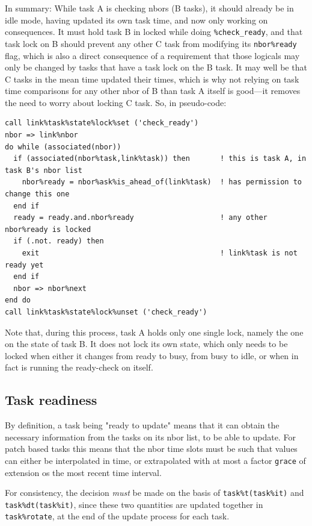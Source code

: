 \documentclass[paper=a4,fontsize=11pt]{scrartcl}
\numberwithin{equation}{section}		%
\numberwithin{figure}{section}			%
\numberwithin{table}{section}				%
\newcommand{\codecolor}{\color{Blue}}
\newcommand{\Code}[1]{{\codecolor\texttt{#1}}}
\begin{document}
In summary:  While task A is checking nbors (B tasks), it should already be in idle mode, having updated its own task time, and now only working on consequences.   It must hold task B in locked while doing \verb|%check_ready|, and that task lock on B should prevent any other C task from modifying its \verb|nbor%ready| flag, which is also a direct consequence of a requirement that those logicals may only be changed by tasks that have a task lock on the B task.  It may well be that C tasks in the mean time updated their times, which is why not relying on task time comparisons for any other nbor of B than task A itself is good---it removes the need to worry about locking C task.  So, in pseudo-code:
{\small\codecolor\begin{verbatim}
call link%task%state%lock%set ('check_ready')
nbor => link%nbor
do while (associated(nbor))
  if (associated(nbor%task,link%task)) then       ! this is task A, in task B's nbor list
    nbor%ready = nbor%ask%is_ahead_of(link%task)  ! has permission to change this one
  end if
  ready = ready.and.nbor%ready                    ! any other nbor%ready is locked
  if (.not. ready) then
    exit                                          ! link%task is not ready yet
  end if
  nbor => nbor%next
end do
call link%task%state%lock%unset ('check_ready')
\end{verbatim}}
Note that, during this process, task A holds only one single lock, namely the one on the state of task B.  It does not lock its own state, which only needs to be locked when either it changes from ready to busy, from busy to idle, or when in fact is running the ready-check on itself.

\subsection{Task readiness}

By definition, a task being "ready to update" means that it can obtain the necessary information from the tasks on its nbor list, to be able to update.  For patch based tasks this means that the nbor time slots must be such that values can either be interpolated in time, or extrapolated with at most a factor \Code{grace} of extension os the most recent time interval.

For consistency, the decision \textit{must} be made on the basis of \Code{task\%t(task\%it)} and \Code{task\%dt(task\%it)}, since these two quantities are updated together in \Code{task\%rotate}, at the end of the update process for each task.  
\end{document}

